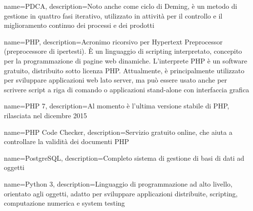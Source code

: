 {
	name=PDCA,
	description={Noto anche come ciclo di Deming, è un metodo di gestione in quattro fasi iterativo, utilizzato in attività per il controllo e il miglioramento continuo dei processi e dei prodotti}
}

{
	name=PHP,
	description={Acronimo ricorsivo per Hypertext Preprocessor (preprocessore di ipertesti). \MakeUppercase{è} un linguaggio di scripting interpretato, concepito per la programmazione di pagine web dinamiche. L'interprete PHP è un software gratuito, distribuito sotto licenza PHP. Attualmente, è principalmente utilizzato per sviluppare applicazioni web lato server, ma può essere usato anche per scrivere script a riga di comando o applicazioni stand-alone con interfaccia grafica}
}

{
	name=PHP 7,
	description={Al momento è l'ultima versione stabile di PHP, rilasciata nel dicembre 2015}
}

{
	name=PHP Code Checker,
	description={Servizio gratuito online, che aiuta a controllare la validità dei documenti PHP}
}

{
	name=PostgreSQL,
	description={Completo sistema di gestione di basi di dati ad oggetti}
}

{
	name=Python 3,
	description={Linguaggio di programmazione ad alto livello, orientato agli oggetti, adatto per sviluppare applicazioni distribuite, scripting, computazione numerica e system testing}
}


